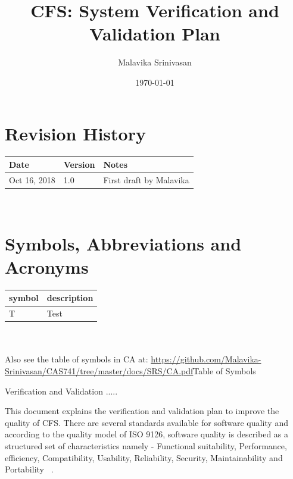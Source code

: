 \documentclass[12pt, titlepage]{article}
\newcommand{\famname}{CFS} %
\begin{document}
\title{CFS: System Verification and Validation Plan} 
\author{Malavika Srinivasan}
\date{\today}
	
\maketitle



\section{Revision History}

\begin{tabularx}{\textwidth}{p{3cm}p{2cm}X}
\toprule {\bf Date} & {\bf Version} & {\bf Notes}\\
\midrule
Oct 16, 2018 & 1.0 & First draft by Malavika\\
\bottomrule
\end{tabularx}

~\newpage

\section{Symbols, Abbreviations and Acronyms}

\renewcommand{\arraystretch}{1.2}
\begin{tabular}{l l} 
  \toprule		
  \textbf{symbol} & \textbf{description}\\
  \midrule 
  T & Test\\
  \bottomrule
\end{tabular}\\
\\
Also see the table of symbols in CA at: \url{https://github.com/Malavika-Srinivasan/CAS741/tree/master/docs/SRS/CA.pdf}{Table of Symbols}\\


\newpage

\tableofcontents

\listoftables

\listoffigures

\newpage


Verification and Validation .....



This document explains the verification and validation plan to improve the quality of \famname{}. There are several standards available for software quality and according to the quality model of ISO 9126,  software quality is described as a structured set of characteristics namely - Functional suitability, Performance, efficiency, Compatibility, Usability,  Reliability, Security, Maintainability and Portability ~\cite{ISO25000}.
\end{document}
